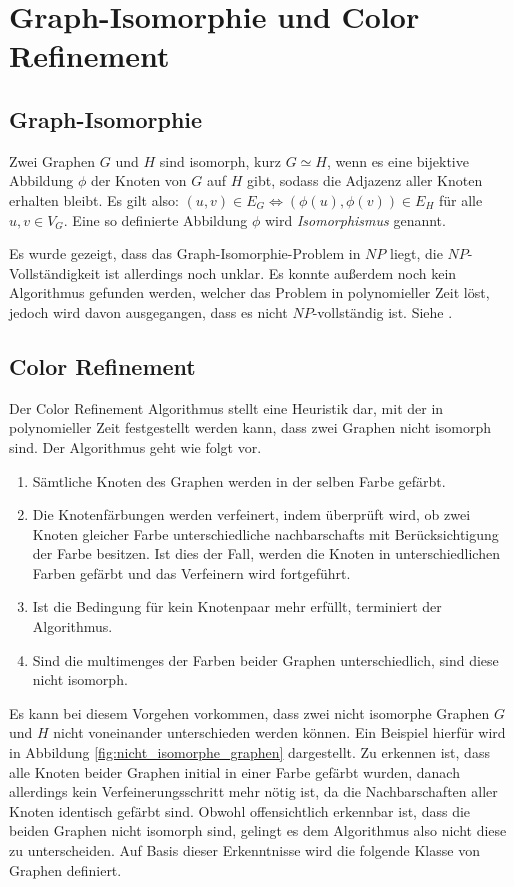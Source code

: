\section{Graph-Isomorphie und Color Refinement}
\label{sec/gi_cr}

\subsection{Graph-Isomorphie}
Zwei Graphen $G$ und $H$ sind isomorph, kurz $G\simeq H$, wenn es eine bijektive Abbildung $\phi$ der Knoten von $G$ auf $H$ gibt, sodass die Adjazenz aller Knoten erhalten bleibt. Es gilt also: $(u,v)\in E_G\Leftrightarrow (\phi (u),\phi (v))\in E_H$ für alle $u,v\in V_G$. Eine so definierte Abbildung $\phi$ wird \emph{Isomorphismus} genannt.

Es wurde gezeigt, dass das Graph-Isomorphie-Problem in $NP$ liegt, die $NP$-Vollständigkeit ist allerdings noch unklar. Es konnte außerdem noch kein Algorithmus gefunden werden, welcher das Problem in polynomieller Zeit löst, jedoch wird davon ausgegangen, dass es nicht $NP$-vollständig ist. Siehe \cite{Goldreich1991}.

\subsection{Color Refinement}
Der Color Refinement Algorithmus stellt eine Heuristik dar, mit der in polynomieller Zeit festgestellt werden kann, dass zwei Graphen nicht isomorph sind. Der Algorithmus geht wie folgt vor.
\begin{enumerate}
	\item Sämtliche Knoten des Graphen werden in der selben Farbe gefärbt.
	\item Die Knotenfärbungen werden verfeinert, indem überprüft wird, ob zwei Knoten gleicher Farbe unterschiedliche \glspl{nachbarschaft} mit Berücksichtigung der Farbe besitzen. Ist dies der Fall, werden die Knoten in unterschiedlichen Farben gefärbt und das Verfeinern wird fortgeführt.
	\item Ist die Bedingung für kein Knotenpaar mehr erfüllt, terminiert der Algorithmus.
	\item Sind die \glspl{multimenge} der Farben beider Graphen unterschiedlich, sind diese nicht isomorph.
\end{enumerate}

Es kann bei diesem Vorgehen vorkommen, dass zwei nicht isomorphe Graphen $G$ und $H$ nicht voneinander unterschieden werden können. Ein Beispiel hierfür wird in Abbildung \ref{fig:nicht_isomorphe_graphen} dargestellt. Zu erkennen ist, dass alle Knoten beider Graphen initial in einer Farbe gefärbt wurden, danach allerdings kein Verfeinerungsschritt mehr nötig ist, da die Nachbarschaften aller Knoten identisch gefärbt sind. Obwohl offensichtlich erkennbar ist, dass die beiden Graphen nicht isomorph sind, gelingt es dem Algorithmus also nicht diese zu unterscheiden. Auf Basis dieser Erkenntnisse wird die folgende Klasse von Graphen definiert.

